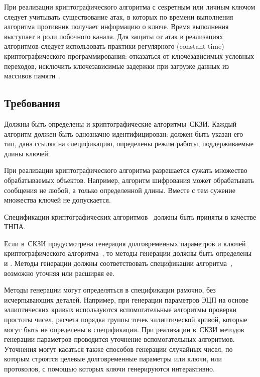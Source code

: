 При реализации криптографического алгоритма с секретным или личным ключом 
следует учитывать существование атак, в которых по времени выполнения алгоритма
противник получает информацию о ключе. Время выполнения выступает в роли 
побочного канала.
%
Для защиты от атак в реализациях алгоритмов следует использовать практики 
регулярного (constant-time) криптографического программирования: отказаться от 
ключезависимых условных переходов, исключить ключезависимые задержки при 
загрузке данных из массивов памяти~.

\subsection{Требования}\label{CS.Reqs}

\label{R.CS.Algs}
Должны быть определены и 
криптографические алгоритмы~СКЗИ. 
%
Каждый алгоритм должен быть однозначно идентифицирован: должен быть указан его
тип, дана ссылка на спецификацию, определены режим работы, поддерживаемые длины
ключей.

\begin{note}
При реализации криптографического алгоритма разрешается сужать множество
обрабатываемых объектов. Например, алгоритм шифрования может обрабатывать
сообщения не любой, а только определенной длины. Вместе с тем сужение множества
ключей не допускается.
\end{note}

\label{R.CS.Std}
Спецификации криптографических алгоритмов~
должны быть приняты в качестве ТНПА.

\label{R.CS.Gen}
Если в~СКЗИ предусмотрена генерация долговременных параметров и ключей 
криптографического алгоритма~, то методы генерации 
должны быть определены и .
%
Методы генерации должны соответствовать спецификации
алгоритма~, возможно уточняя или расширяя ее.

\begin{note}
Методы генерации могут определяться в спецификации рамочно, без исчерпывающих 
деталей.
%
Например, при генерации параметров ЭЦП на основе эллиптических кривых
используются вспомогательные алгоритмы проверки простоты чисел, расчета порядка
группы точек эллиптической кривой, которые могут быть не определены в спецификации.
%
При реализации в~СКЗИ методов генерации параметров проводится уточнение 
вспомогательных алгоритмов.
%
Уточнения могут касаться также способов генерации случайных чисел,
по которым строятся целевые долговременные параметры или ключи,
или протоколов, с помощью которых ключи генерируются интерактивно.
\end{note}

